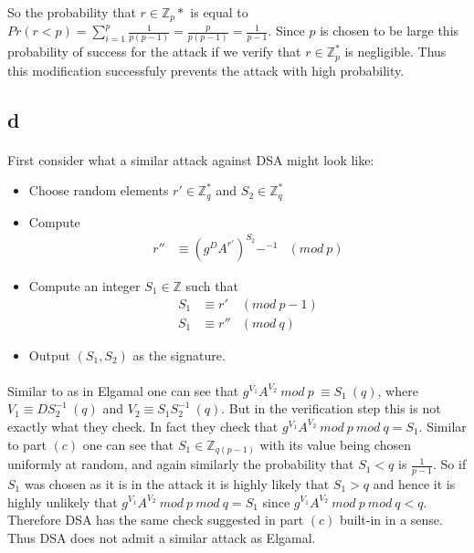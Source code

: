 \documentclass[letterpaper,12pt,oneside,onecolumn]{report}
\begin{document}
\paragraph{}
So the probability that $r \in \mathbb{Z}_p*$ is equal to $Pr(r < p) = \sum_{i=1}^p \frac{1}{p(p-1)} = \frac{p}{p(p-1)} = \frac{1}{p-1}$. Since $p$ is chosen to be large this probability of success for the attack if we verify that $r \in \mathbb{Z}_p^*$ is negligible. Thus this modification successfuly prevents the attack with high probability.
\subsection*{d}
\paragraph{}
First consider what a similar attack against DSA might look like:
\begin{itemize}
\item Choose random elements $r' \in \mathbb{Z}_q^*$ and $S_2 \in \mathbb{Z}_q^*$
\item Compute
\begin{align*}
r'' &\equiv (g^DA^{r'})^{S_2}-^{-1} &(mod\ p)
\end{align*}
\item Compute an integer $S_1 \in \mathbb{Z}$ such that
\begin{align*}
S_1 &\equiv r' &(mod\ p-1)\\
S_1 &\equiv r'' &(mod\ q)
\end{align*}
\item Output $(S_1,S_2)$ as the signature.
\end{itemize}
\paragraph{}
Similar to as in Elgamal one can see that $g^{V_1}A^{V_2}\ mod\ p\  \equiv S_1\ (q)$, where $V_1 \equiv DS_2^{-1}\ (q)$ and $V_2 \equiv S_1S_2^{-1}\ (q)$. But in the verification step this is not exactly what they check. In fact they check that $g^{V_1}A^{V_2}\ mod\ p\ mod\ q = S_1$. Similar to part $(c)$ one can see that $S_1 \in \mathbb{Z}_{q(p-1)}$ with its value being chosen uniformly at random, and again similarly the probability that $S_1 < q$ is $\frac{1}{p-1}$. So if $S_1$ was chosen as it is in the attack it is highly likely that $S_1 > q$ and hence it is highly unlikely that $g^{V_1}A^{V_2}\ mod\ p\ mod\ q = S_1$ since $g^{V_1}A^{V_2}\ mod\ p\ mod\ q < q$. Therefore DSA has the same check suggested in part $(c)$ built-in in a sense. Thus DSA does not admit a similar attack as Elgamal.
\end{document}
